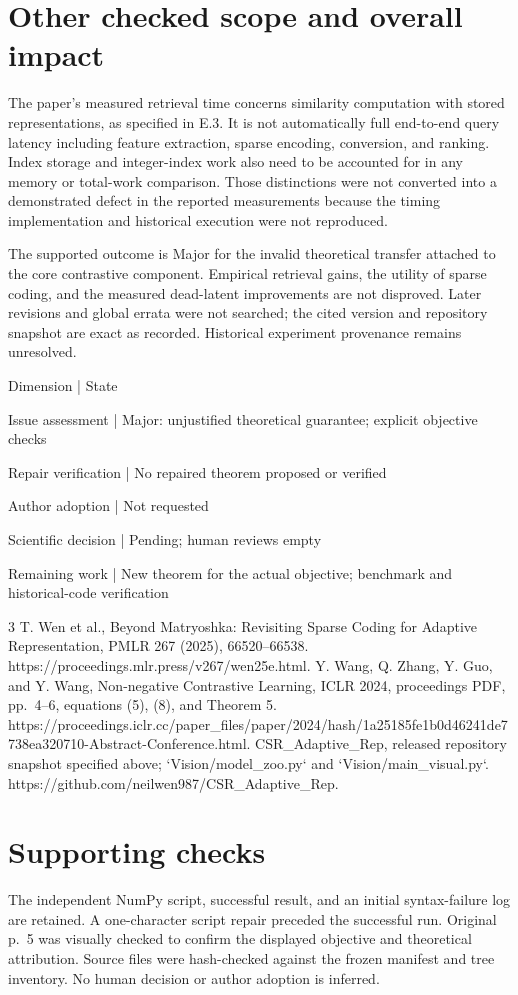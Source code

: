 \documentclass[10pt]{article}
\begin{document}
\section*{Other checked scope and overall impact}
The paper’s measured retrieval time concerns similarity computation with stored representations, as specified in E.3. It is not automatically full end-to-end query latency including feature extraction, sparse encoding, conversion, and ranking. Index storage and integer-index work also need to be accounted for in any memory or total-work comparison. Those distinctions were not converted into a demonstrated defect in the reported measurements because the timing implementation and historical execution were not reproduced.\par
The supported outcome is Major for the invalid theoretical transfer attached to the core contrastive component. Empirical retrieval gains, the utility of sparse coding, and the measured dead-latent improvements are not disproved. Later revisions and global errata were not searched; the cited version and repository snapshot are exact as recorded. Historical experiment provenance remains unresolved.\par
Dimension | State\par
Issue assessment | Major: unjustified theoretical guarantee; explicit objective checks\par
Repair verification | No repaired theorem proposed or verified\par
Author adoption | Not requested\par
Scientific decision | Pending; human reviews empty\par
Remaining work | New theorem for the actual objective; benchmark and historical-code verification\par
3 T. Wen et al., Beyond Matryoshka: Revisiting Sparse Coding for Adaptive Representation, PMLR 267 (2025), 66520–66538. https://proceedings.mlr.press/v267/wen25e.html. Y. Wang, Q. Zhang, Y. Guo, and Y. Wang, Non-negative Contrastive Learning, ICLR 2024, proceedings PDF, pp. 4–6, equations (5), (8), and Theorem 5. https://proceedings.iclr.cc/paper\_files/paper/2024/hash/1a25185fe1b0d46241de7738ea320710-Abstract-Conference.html. CSR\_Adaptive\_Rep, released repository snapshot specified above; `Vision/model\_zoo.py` and `Vision/main\_visual.py`. https://github.com/neilwen987/CSR\_Adaptive\_Rep.\par
\section*{Supporting checks}
The independent NumPy script, successful result, and an initial syntax-failure log are retained. A one-character script repair preceded the successful run. Original p. 5 was visually checked to confirm the displayed objective and theoretical attribution. Source files were hash-checked against the frozen manifest and tree inventory. No human decision or author adoption is inferred.\par
\end{document}
